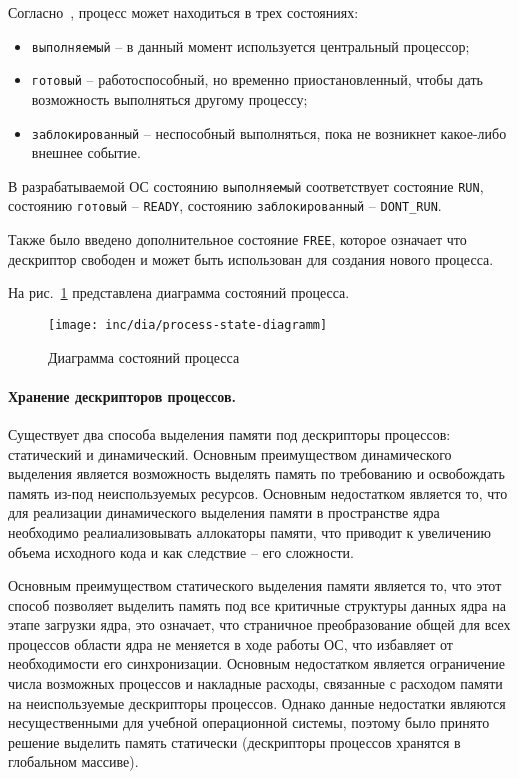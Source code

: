 Согласно~\cite{tanenbaum}, процесс может находиться в трех состояниях:
\begin{itemize}
\item \texttt{выполняемый} -- в данный момент используется центральный процессор;
\item \texttt{готовый} -- работоспособный, но временно приостановленный, чтобы дать
	возможность выполняться другому процессу;
\item \texttt{заблокированный} -- неспособный выполняться, пока не возникнет какое-либо
	внешнее событие.
\end{itemize}

В разрабатываемой ОС состоянию \texttt{выполняемый} соответствует состояние \texttt{RUN},
состоянию \texttt{готовый} -- \texttt{READY}, состоянию \texttt{заблокированный} -- \texttt{DONT\_RUN}.

Также было введено дополнительное состояние \texttt{FREE}, которое означает что дескриптор свободен и
может быть использован для создания нового процесса.

На рис.~\ref{fig:process-state-diagramm} представлена диаграмма состояний процесса.

\begin{figure}[ht!]
  \centering
  \texttt{[image: inc/dia/process-state-diagramm]}
  \caption{Диаграмма состояний процесса}
  \label{fig:process-state-diagramm}
\end{figure}

\paragraph{Хранение дескрипторов процессов.}
Существует два способа выделения памяти под дескрипторы процессов: статический и динамический.
Основным преимуществом динамического выделения является возможность выделять память по требованию
и освобождать память из-под неиспользуемых ресурсов. Основным недостатком является то, что
для реализации динамического выделения памяти в пространстве ядра необходимо реалиализовывать
аллокаторы памяти, что приводит к увеличению объема исходного кода и как следствие -- его сложности.

Основным преимуществом статического выделения памяти является то, что этот способ позволяет
выделить память под все критичные структуры данных ядра на этапе загрузки ядра, это означает,
что страничное преобразование общей для всех процессов области ядра не меняется в ходе работы
ОС, что избавляет от необходимости его синхронизации. Основным недостатком является ограничение
числа возможных процессов и накладные расходы, связанные с расходом памяти на неиспользуемые
дескрипторы процессов. Однако данные недостатки являются несущественными для учебной операционной
системы, поэтому было принято решение выделить память статически (дескрипторы процессов хранятся
в глобальном массиве).


